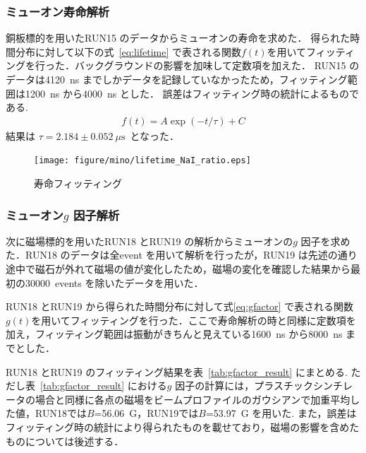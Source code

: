 
\subsubsection{ミューオン寿命解析}
銅板標的を用いたRUN15 のデータからミューオンの寿命を求めた．
得られた時間分布に対して以下の式~\eqref{eq:lifetime} で表される関数$f(t)$を用いてフィッティングを行った．バックグラウンドの影響を加味して定数項を加えた．
RUN15 のデータは4120~ns までしかデータを記録していなかったため，フィッティング範囲は1200~ns から4000~ns とした．
誤差はフィッティング時の統計によるものである.
\begin{gather}
f(t) = A\exp(-t / \tau)+C \label{eq:lifetime}
\end{gather}
結果は $\tau = 2.184 \pm 0.052~\mu \mathrm{s}$~となった．
\begin{figure}[H]
\centering
\texttt{[image: figure/mino/lifetime\_NaI\_ratio.eps]}
\caption{寿命フィッティング}
\end{figure}


\subsubsection{ミューオン$g$ 因子解析}

次に磁場標的を用いたRUN18 とRUN19 の解析からミューオンの$g$ 因子を求めた．RUN18 のデータは全event を用いて解析を行ったが，RUN19 は先述の通り途中で磁石が外れて磁場の値が変化したため，磁場の変化を確認した結果から最初の30000~events を除いたデータを用いた．

RUN18 とRUN19 から得られた時間分布に対して式\eqref{eq:gfactor} で表される関数$g(t)$を用いてフィッティングを行った．ここで寿命解析の時と同様に定数項を加え，フィッティング範囲は振動がきちんと見えている1600~ns から8000~ns までとした．

RUN18 とRUN19 のフィッティング結果を表~\ref{tab:gfactor_result} にまとめる.
ただし表~\ref{tab:gfactor_result} における$g$ 因子の計算には，プラスチックシンチレータの場合と同様に各点の磁場をビームプロファイルのガウシアンで加重平均した値，RUN18では$B$=56.06~G，RUN19では$B$=53.97~G を用いた.
また，誤差はフィッティング時の統計により得られたものを載せており，磁場の影響を含めたものについては後述する．

